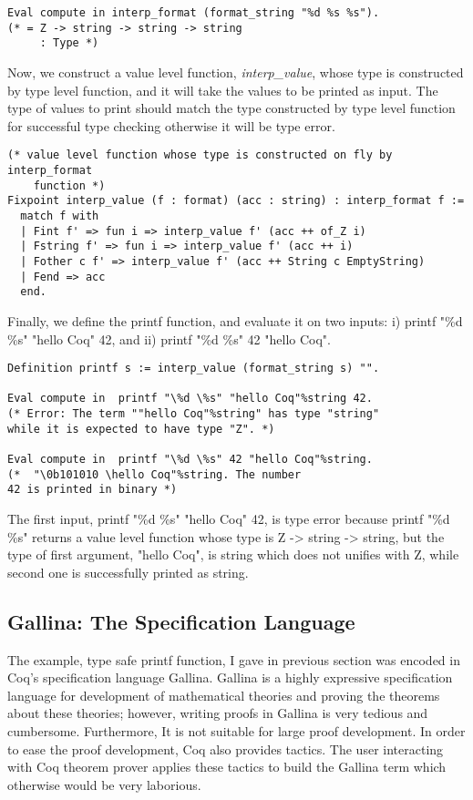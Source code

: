\begin{verbatim}
Eval compute in interp_format (format_string "%d %s %s").
(* = Z -> string -> string -> string
     : Type *)
\end{verbatim}

Now, we construct a value level function, \textit{interp\_value}, whose type 
is constructed by type level function, and it will take the values to be printed as input.
The type of values to print should match the type constructed by type level 
function for successful type checking otherwise it will be type error. 

\begin{verbatim}
(* value level function whose type is constructed on fly by interp_format 
    function *)
Fixpoint interp_value (f : format) (acc : string) : interp_format f :=
  match f with
  | Fint f' => fun i => interp_value f' (acc ++ of_Z i)
  | Fstring f' => fun i => interp_value f' (acc ++ i)
  | Fother c f' => interp_value f' (acc ++ String c EmptyString)
  | Fend => acc
  end.
\end{verbatim}

\noindent
Finally, we define the printf function, and evaluate it on two inputs: 
i)  printf "\%d \%s" "hello Coq" 42, and ii)  printf "\%d \%s" 42 "hello Coq".

\begin{verbatim}
Definition printf s := interp_value (format_string s) "".           

Eval compute in  printf "\%d \%s" "hello Coq"%string 42.
(* Error: The term ""hello Coq"%string" has type "string" 
while it is expected to have type "Z". *)

Eval compute in  printf "\%d \%s" 42 "hello Coq"%string. 
(*  "\0b101010 \hello Coq"%string. The number 
42 is printed in binary *)                            
\end{verbatim}
The first input, printf "\%d \%s" "hello Coq" 42, is type error because 
printf "\%d \%s" returns a value level function whose  type is Z -> string -> string, but 
the type of first argument, "hello Coq", is string which does not unifies with Z,
while second one is successfully printed as string. 

  
  

 
 \subsection{Gallina: The Specification Language}
 \label{sec:gallina}
  The example, type safe printf function, I gave in previous 
  section was encoded in Coq's specification language Gallina. 
  Gallina is a highly expressive specification 
  language for development of mathematical theories and proving the    
  theorems about these  theories; however, writing proofs in Gallina
  is very tedious and cumbersome. Furthermore, It is not suitable for large proof 
  development. In order to ease the proof development, Coq also provides 
  tactics.  The user interacting with Coq theorem prover applies these 
  tactics to build the  Gallina term  which otherwise would  
  be very laborious.
  
